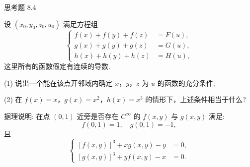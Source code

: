 \begin{exblock}{思考题 8.4}
\item 设 $(x_{0},y_{0},z_{0},u_{0})$ 满足方程组
\[
  \left\{\begin{aligned}
    f(x) + f(y) + f(z) &= F(u), \\
    g(x) + g(y) + g(z) &= G(u), \\
    h(x) + h(y) + h(z) &= H(u),
  \end{aligned}\right.
\]
这里所有的函数假定有连续的导数.

(1) 说出一个能在该点开邻域内确定 $x$，$y$，$z$ 为 $u$ 的函数的充分条件;

(2) 在 $f(x) = x$，$g(x) = x^{2}$，$h(x) = x^{3}$ 的情形下，上述条件相当于什么?

\item 据理说明: 在点 $(0,1)$ 近旁是否存在 $C^{\infty}$ 的 $f(x,y)$ 与 $g(x,y)$ 满足:
\[
  f(0,1) = 1,\quad g(0,1) = -1,
\]
且
\[
  \left\{\begin{aligned}
    [f(x,y)]^{3} + x g(x,y) - y &= 0, \\
    [g(x,y)]^{3} + y f(x,y) - x &= 0.
  \end{aligned}\right.
\]
\end{exblock}
